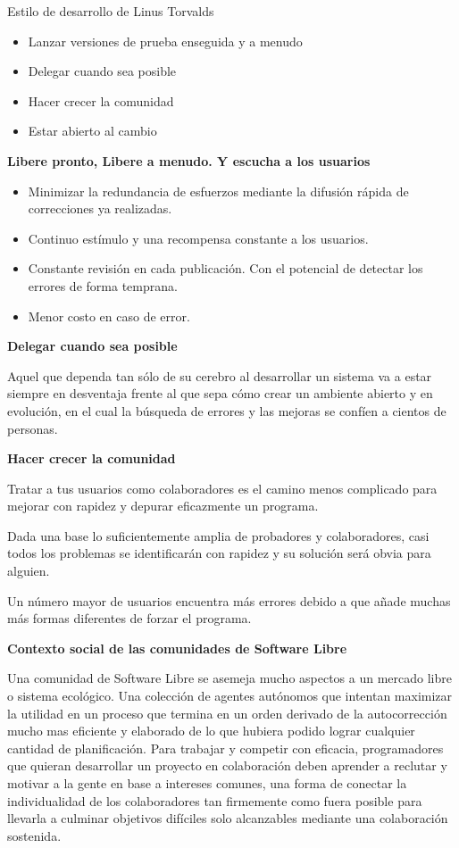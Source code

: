 Estilo de desarrollo de Linus Torvalds     
\begin{itemize}
     \item Lanzar versiones de prueba enseguida y a menudo
     \item Delegar cuando sea posible
     \item Hacer crecer la comunidad
     \item Estar abierto al cambio
\end{itemize}

\textbf{Libere pronto, Libere a menudo. Y escucha a los usuarios}
\begin{itemize}
\item Minimizar la redundancia de esfuerzos mediante la difusión rápida de correcciones ya realizadas.
\item Continuo estímulo y una recompensa constante a los usuarios.
\item Constante revisión en cada publicación. Con el potencial de detectar los errores de forma temprana.
\item Menor costo en caso de error.
\end{itemize}

\textbf{Delegar cuando sea posible}

Aquel que dependa tan sólo de su cerebro al desarrollar un sistema va a estar siempre en desventaja frente al que sepa cómo crear un ambiente abierto y en evolución, en el cual la búsqueda de errores y las mejoras se confíen a cientos de personas.  

\textbf{Hacer crecer la comunidad}

Tratar a tus usuarios como colaboradores es el camino menos complicado para mejorar con rapidez y depurar eficazmente un programa.

Dada una base lo suficientemente amplia de probadores y colaboradores, casi todos los problemas se identificarán con rapidez y su solución será obvia para alguien.  

Un número mayor de usuarios encuentra más errores debido a que añade muchas más formas diferentes de forzar el programa.

\textbf{Contexto social de las comunidades de Software Libre} 

Una comunidad de Software Libre se asemeja mucho aspectos a un mercado libre o sistema ecológico.
Una colección de agentes autónomos que intentan maximizar la utilidad en un proceso que termina en un orden derivado de la autocorrección mucho mas eficiente y elaborado de lo que hubiera podido lograr cualquier cantidad de planificación.
Para trabajar y competir con eficacia, programadores que quieran desarrollar un proyecto en colaboración deben aprender a reclutar y motivar a la gente en base a intereses comunes, una forma de conectar la individualidad de los colaboradores tan firmemente como fuera posible para llevarla a culminar objetivos difíciles solo alcanzables mediante una colaboración sostenida. 

